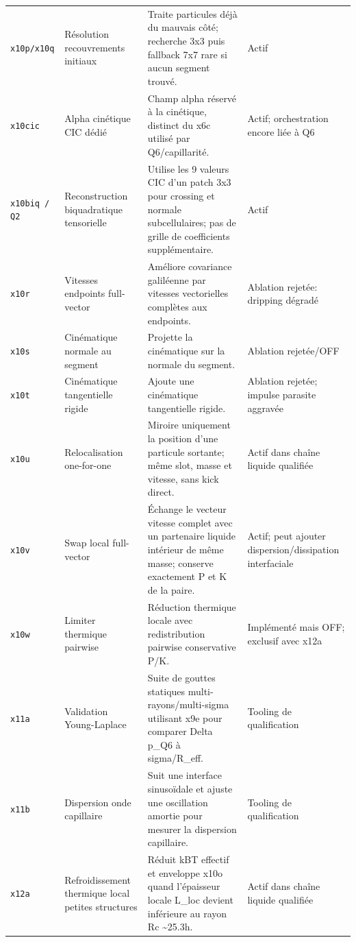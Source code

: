 \documentclass[a4paper,9pt]{article}
\begin{document}
\begin{landscape}
\begin{longtable}{L{2.35cm} L{5.3cm} L{13.25cm} L{4.75cm}}
\texttt{x10p/x10q} & Résolution recouvrements initiaux & Traite particules déjà du mauvais côté; recherche 3x3 puis fallback 7x7 rare si aucun segment trouvé. & Actif \\
\texttt{x10cic} & Alpha cinétique CIC dédié & Champ alpha réservé à la cinétique, distinct du x6c utilisé par Q6/capillarité. & Actif; orchestration encore liée à Q6 \\
\texttt{x10biq / Q2} & Reconstruction biquadratique tensorielle & Utilise les 9 valeurs CIC d'un patch 3x3 pour crossing et normale subcellulaires; pas de grille de coefficients supplémentaire. & Actif \\
\texttt{x10r} & Vitesses endpoints full-vector & Améliore covariance galiléenne par vitesses vectorielles complètes aux endpoints. & Ablation rejetée: dripping dégradé \\
\texttt{x10s} & Cinématique normale au segment & Projette la cinématique sur la normale du segment. & Ablation rejetée/OFF \\
\texttt{x10t} & Cinématique tangentielle rigide & Ajoute une cinématique tangentielle rigide. & Ablation rejetée; impulse parasite aggravée \\
\texttt{x10u} & Relocalisation one-for-one & Miroire uniquement la position d'une particule sortante; même slot, masse et vitesse, sans kick direct. & Actif dans chaîne liquide qualifiée \\
\texttt{x10v} & Swap local full-vector & Échange le vecteur vitesse complet avec un partenaire liquide intérieur de même masse; conserve exactement P et K de la paire. & Actif; peut ajouter dispersion/dissipation interfaciale \\
\texttt{x10w} & Limiter thermique pairwise & Réduction thermique locale avec redistribution pairwise conservative P/K. & Implémenté mais OFF; exclusif avec x12a \\
\texttt{x11a} & Validation Young-Laplace & Suite de gouttes statiques multi-rayons/multi-sigma utilisant x9e pour comparer Delta p\_Q6 à sigma/R\_eff. & Tooling de qualification \\
\texttt{x11b} & Dispersion onde capillaire & Suit une interface sinusoïdale et ajuste une oscillation amortie pour mesurer la dispersion capillaire. & Tooling de qualification \\
\texttt{x12a} & Refroidissement thermique local petites structures & Réduit kBT effectif et enveloppe x10o quand l'épaisseur locale L\_loc devient inférieure au rayon Rc \textasciitilde{}25.3h. & Actif dans chaîne liquide qualifiée \\

\end{longtable}
\end{landscape}
\end{document}
